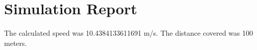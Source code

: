 \documentclass{article}
\begin{document}
\section{Simulation Report}
The calculated speed was 10.4384133611691 m/s.
The distance covered was 100 meters.
\end{document}
